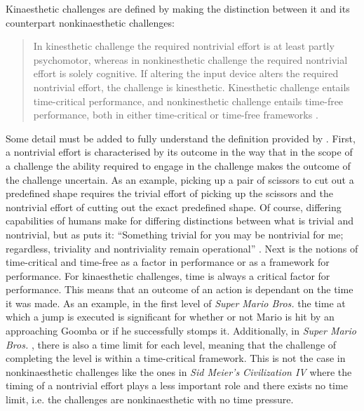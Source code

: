 Kinaesthetic challenges are defined by making the distinction between it and its counterpart nonkinaesthetic challenges:
\begin{quote}
  In kinesthetic challenge the required nontrivial effort is at least partly psychomotor, whereas in nonkinesthetic challenge the required nontrivial effort is solely cognitive. If altering the input device alters the required nontrivial effort, the challenge is kinesthetic. Kinesthetic challenge entails time-critical performance, and nonkinesthetic challenge entails time-free performance, both in either time-critical or time-free frameworks \cite{karhulahti}.
\end{quote}
Some detail must be added to fully understand the definition provided by . First, a nontrivial effort is characterised by its outcome in the way that in the scope of a challenge the ability required to engage in the challenge makes the outcome of the challenge uncertain. As an example, picking up a pair of scissors to cut out a predefined shape requires the trivial effort of picking up the scissors and the nontrivial effort of cutting out the exact predefined shape. Of course, differing capabilities of humans make for differing distinctions between what is trivial and nontrivial, but as  puts it: ``Something trivial for you may be nontrivial for me; regardless, triviality and nontriviality remain operational'' \cite{karhulahti}. Next is the notions of time-critical and time-free as a factor in performance or as a framework for performance. For kinaesthetic challenges, time is always a critical factor for performance. This means that an outcome of an action is dependant on the time it was made. As an example, in the first level of \textit{Super Mario Bros.} \cite{mario} the time at which a jump is executed is significant for whether or not Mario is hit by an approaching Goomba or if he successfully stomps it. Additionally, in \textit{Super Mario Bros.} \cite{mario}, there is also a time limit for each level, meaning that the challenge of completing the level is within a time-critical framework. This is not the case in nonkinaesthetic challenges like the ones in \textit{Sid Meier's Civilization IV} where the timing of a nontrivial effort plays a less important role and there exists no time limit, i.e. the challenges are nonkinaesthetic with no time pressure.

